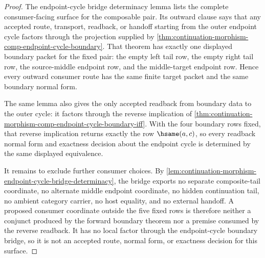 \begin{proof}
The endpoint-cycle bridge determinacy lemma lists the complete consumer-facing
surface for the composable pair. Its outward clause says that any accepted
route, transport, readback, or handoff starting from the outer endpoint cycle
factors through the projection supplied by
\autoref{thm:continuation-morphism-comp-endpoint-cycle-boundary}. That theorem
has exactly one displayed boundary packet for the fixed pair: the empty left
tail row, the empty right tail row, the source-middle endpoint row, and the
middle-target endpoint row. Hence every outward consumer route has the same
finite target packet and the same boundary normal form.

The same lemma also gives the only accepted readback from boundary data to the
outer cycle: it factors through the reverse implication of
\autoref{thm:continuation-morphism-comp-endpoint-cycle-boundary-iff}. With the
four boundary rows fixed, that reverse implication returns exactly the row
$\hsame(a,c)$, so every readback normal form and exactness decision about the
endpoint cycle is determined by the same displayed equivalence.

It remains to exclude further consumer choices. By
\autoref{lem:continuation-morphism-endpoint-cycle-bridge-determinacy}, the
bridge exports no separate composite-tail coordinate, no alternate middle
endpoint coordinate, no hidden continuation tail, no ambient category carrier,
no host equality, and no external handoff. A proposed consumer coordinate
outside the five fixed rows is therefore neither a conjunct produced by the
forward boundary theorem nor a premise consumed by the reverse readback. It has
no local factor through the endpoint-cycle boundary bridge, so it is not an
accepted route, normal form, or exactness decision for this surface.
\end{proof}
